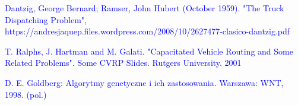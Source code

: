 \documentclass[a4paper, twoside, 12pt, justified]{article}
\begin{document}
	
	
	\newpage
	\renewcommand\refname{Źródła}
	\begin{thebibliography}{}
		{\hypertarget{vrp}{\textcolor{blue}{
		 Dantzig, George Bernard; Ramser, John Hubert (October 1959). "The Truck Dispatching Problem", https://andresjaquep.files.wordpress.com/2008/10/2627477-clasico-dantzig.pdf}}}
		
		{\hypertarget{cvrp}{\textcolor{blue}{T. Ralphs, J. Hartman and M. Galati. "Capacitated Vehicle Routing and Some Related Problems". Some CVRP Slides. Rutgers University. 2001}}}
		
		{\hypertarget{ag}{\textcolor{blue}{
		D. E. Goldberg: Algorytmy genetyczne i ich zastosowania. Warszawa: WNT, 1998. (pol.)}}}
		
	\end{thebibliography}
	
	
	
\end{document}
